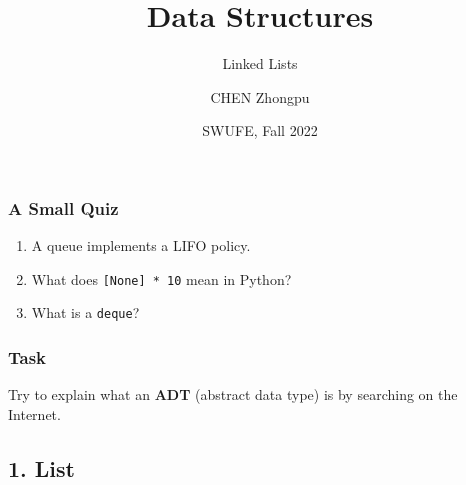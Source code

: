 \documentclass[aspectratio=169, 14pt]{beamer}
\title[Data Structures] %
{Data Structures}
\subtitle{Linked Lists}
\author[CHEN Zhongpu] %
{CHEN Zhongpu}
\institute[] %
{
  School of Computing and Artificial Intelligence \\
  \href{mailto:zpchen@swufe.edu.cn}{zpchen@swufe.edu.cn}
}
\date[] %
{SWUFE, Fall 2022}
\begin{document}
\frame{\titlepage}

\begin{frame}
\frametitle{A Small Quiz}
\begin{enumerate}
    \item A queue implements a LIFO policy.
    \item What does \texttt{[None] * 10} mean in Python?
    \item What is a \texttt{deque}?
\end{enumerate}
\end{frame}


\begin{frame}
    \frametitle{Task}
Try to explain what an \textbf{ADT} (abstract data type) is by searching on the Internet.
    

\end{frame}

{
    \begin{frame}
        \section{\textcolor{darkmidnightblue}{1. List}}
    \end{frame}

}
\end{document}
